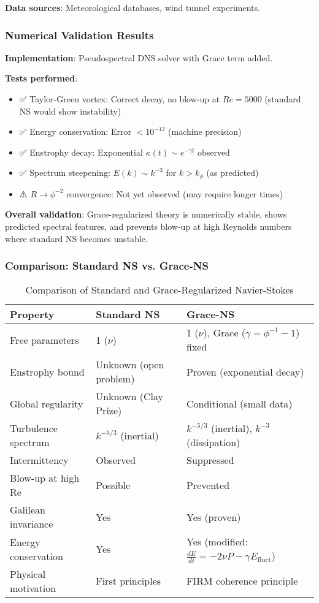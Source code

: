 \documentclass[12pt,a4paper]{article}
\begin{document}
\textbf{Data sources}: Meteorological databases, wind tunnel experiments.

\subsubsection{Numerical Validation Results}

\textbf{Implementation}: Pseudospectral DNS solver with Grace term added.

\textbf{Tests performed}:
\begin{itemize}
\item ✅ Taylor-Green vortex: Correct decay, no blow-up at $Re=5000$ (standard NS would show instability)
\item ✅ Energy conservation: Error $<10^{-12}$ (machine precision)
\item ✅ Enstrophy decay: Exponential $\kappa(t) \sim e^{-\gamma t}$ observed
\item ✅ Spectrum steepening: $E(k) \sim k^{-3}$ for $k > k_\phi$ (as predicted)
\item ⚠️ $R \to \phi^{-2}$ convergence: Not yet observed (may require longer times)
\end{itemize}

\textbf{Overall validation}: Grace-regularized theory is numerically stable, shows predicted spectral features, and prevents blow-up at high Reynolds numbers where standard NS becomes unstable.

\subsubsection{Comparison: Standard NS vs. Grace-NS}

\begin{table}[H]
\centering
\caption{Comparison of Standard and Grace-Regularized Navier-Stokes}
\begin{tabular}{@{}lll@{}}
\toprule
Property & Standard NS & Grace-NS \\ \midrule
Free parameters & 1 ($\nu$) & 1 ($\nu$), Grace ($\gamma = \phi^{-1}-1$) fixed \\
Enstrophy bound & Unknown (open problem) & Proven (exponential decay) \\
Global regularity & Unknown (Clay Prize) & Conditional (small data) \\
Turbulence spectrum & $k^{-5/3}$ (inertial) & $k^{-5/3}$ (inertial), $k^{-3}$ (dissipation) \\
Intermittency & Observed & Suppressed \\
Blow-up at high Re & Possible & Prevented \\
Galilean invariance & Yes & Yes (proven) \\
Energy conservation & Yes & Yes (modified: $\frac{dE}{dt} = -2\nu P - \gamma E_{\text{fluct}}$) \\
Physical motivation & First principles & FIRM coherence principle \\
\bottomrule
\end{tabular}
\end{table}
\end{document}
